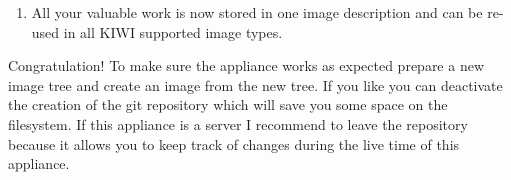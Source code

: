 \begin{enumerate}
\begin{itemize}
\begin{Command}{8cm}
git diff > /tmp/appliancePatch
\end{Command}

            The created patch should become part of your image description
            and you should make sure the patch is applied when preparing the
            image. According to this the command:

\begin{Command}{8cm}
patch -p0 < appliancePatch
\end{Command}

            needs to be added as part of your  script

      \item Check for new non binary files added. This can be done by
            calling:
            
\begin{Command}{4cm}
git status
\end{Command}

	        All files not under version control so far will be listed by
            the command above. Check the contents of this list make sure
            to add all files which are not created automatically to
            become part of your image description. To do this simply
            clone (copy) these files with respect to the filesystem
            structure as overlay files in your image description 
            directory.
      \end{itemize}
\item All your valuable work is now stored in one image description
      and can be re-used in all KIWI supported image types. 
\end{enumerate}

Congratulation!
To make sure the appliance works as expected prepare a new image
tree and create an image from the new tree. If you like you can
deactivate the creation of the git repository which will save you
some space on the filesystem. If this appliance is a server I recommend
to leave the repository because it allows you to keep track of changes
during the live time of this appliance.

